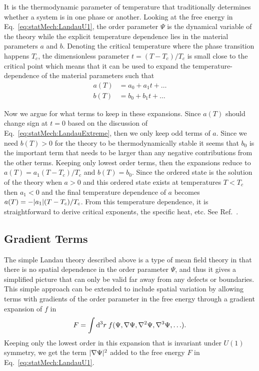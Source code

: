 It is the thermodynamic parameter of temperature that traditionally determines whether a system is in one phase or another.
Looking at the free energy in Eq.~\eqref{eq:statMech:LandauU1}, the order parameter $\Psi$ is the dynamical variable 
of the theory while the explicit temperature dependence lies in the material parameters $a$ and $b$. Denoting 
the critical temperature where the phase transition happens $T_c$, the dimensionless parameter
$t = (T-T_c)/T_c$ is small close to the critical point which means that it can be used to expand the temperature-dependence
of the material parameters such that
\begin{equation}
    \label{eq:statMech:matTempExpan}
    \begin{split}
        a(T) &= a_0 + a_1t + \ldots\\
        b(T) &= b_0 + b_1t + \ldots
    \end{split}
\end{equation}

Now we argue for what terms to keep in these expansions. Since $a(T)$ should change sign at $t=0$ based on the discussion of
Eq.~\eqref{eq:statMech:LandauExtreme}, then we only keep odd terms of $a$.
Since we need $b(T)>0$ for the theory to be thermodynamically stable it seems that $b_0$ is the important term that needs to be
larger than any negative contributions from the other terms. Keeping only lowest order terms, then the expansions reduce to
$a(T) = a_1(T-T_c)/T_c$ and $b(T) = b_0$. Since the ordered state is the solution of the theory when $a>0$ and this ordered
state exists at temperatures $T<T_c$ then $a_1<0$ and the final temperature dependence of $a$ becomes
$a(T) = -\lvert a_1 \rvert(T-T_c)/T_c$. From this temperature dependence, it is straightforward to derive critical exponents, the specific
heat, etc. See Ref.~\cite{Nishimori15}.

\subsection{Gradient Terms}

The simple Landau theory described above is a type of mean field theory in that there is no spatial dependence in the
order parameter $\Psi$, and thus it gives a simplified picture that can only be valid far away from any defects or boundaries. This simple approach
can be extended to include spatial variation by allowing terms with gradients of the order parameter in the free energy through
a gradient expansion of $f$ in
\begin{equation}
    \label{eq:statMech:gradTerms:gradExpansion}
    F = \int\mathop{\textrm{d}\kern0em^3r\kern0.1em}f(\Psi, \nabla\Psi, \nabla^2\Psi, \nabla^3\Psi, \ldots).
\end{equation}
Keeping only the lowest order in this expansion that is invariant under $U(1)$ symmetry, we get the term
$\lvert \nabla\Psi \rvert^2$ added to the free energy $F$ in Eq.~\eqref{eq:statMech:LandauU1}.

